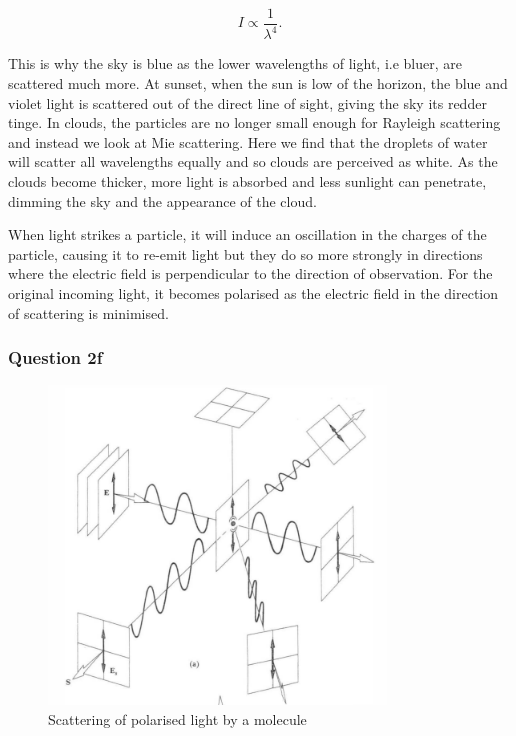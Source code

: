 \documentclass{article}
\begin{document}
\begin{equation}
    I \propto \frac{1}{\lambda^4}.
\end{equation}

This is why the sky is blue as the lower wavelengths of light, i.e bluer, are 
scattered much more. At sunset, when the sun is low of the horizon, the blue
and violet light is scattered out of the direct line of sight, giving the sky
its redder tinge. In clouds, the particles are no longer small enough for 
Rayleigh scattering and instead we look at Mie scattering. Here we find that 
the droplets of water will scatter all wavelengths equally and so clouds are
perceived as white. As the clouds become thicker, more light is absorbed and 
less sunlight can penetrate, dimming the sky and the appearance of the cloud.

When light strikes a particle, it will induce an oscillation in the charges 
of the particle, causing it to re-emit light but they do so more strongly in
directions where the electric field is perpendicular to the direction of 
observation. For the original incoming light, it becomes polarised as the 
electric field in the direction of scattering is minimised.

\subsubsection{Question 2f}

\begin{figure}[H]
    \centering
    \includegraphics[width=0.8\textwidth]{prework.png}
    \caption{Scattering of polarised light by a molecule}
\end{figure}
\end{document}
